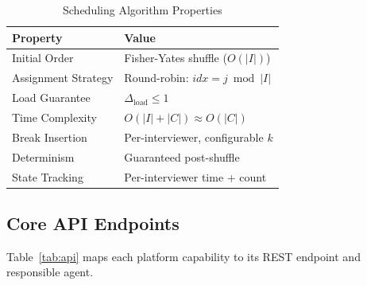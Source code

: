 \documentclass[conference]{IEEEtran}
\begin{document}
\begin{table}[htbp]
\caption{Scheduling Algorithm Properties}
\label{tab:sched_props}
\begin{center}
\begin{tabular}{|l|l|}
\hline
\textbf{Property} & \textbf{Value} \\
\hline
Initial Order         & Fisher-Yates shuffle ($O(|I|)$) \\
Assignment Strategy   & Round-robin: $idx = j \bmod |I|$ \\
Load Guarantee        & $\Delta_{\text{load}} \leq 1$ \\
Time Complexity       & $O(|I| + |C|) \approx O(|C|)$ \\
Break Insertion       & Per-interviewer, configurable $k$ \\
Determinism           & Guaranteed post-shuffle \\
State Tracking        & Per-interviewer time + count \\
\hline
\end{tabular}
\end{center}
\end{table}

\subsection{Core API Endpoints}

Table~\ref{tab:api} maps each platform capability to its REST endpoint and responsible agent.

\begin{table}[htbp]
\caption{Core API Endpoints and Responsible Agents}
\label{tab:api}
\begin{center}
\end{center}
\end{table}
\end{document}
